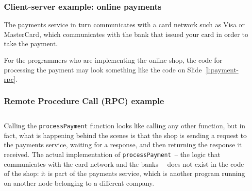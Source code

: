 \begin{frame}
    \label{s:payment-example}
    \frametitle{Client-server example: online payments}
    \begin{center}
    \end{center}
\end{frame}

The payments service in turn communicates with a card network such as Visa or MasterCard, which communicates with the bank that issued your card in order to take the payment.

For the programmers who are implementing the online shop, the code for processing the payment may look something like the code on Slide~\ref{l:payment-rpc}.

\begin{frame}
    \label{s:payment-rpc}
    \frametitle{Remote Procedure Call (RPC) example}
    \inputminted{java}{code/payment-rpc.java}
\end{frame}
\label{l:payment-rpc}

Calling the \verb|processPayment| function looks like calling any other function, but in fact, what is happening behind the scenes is that the shop is sending a request to the payments service, waiting for a response, and then returning the response it received.
The actual implementation of \verb|processPayment|~-- the logic that communicates with the card network and the banks~-- does not exist in the code of the shop: it is part of the payments service, which is another program running on another node belonging to a different company.

